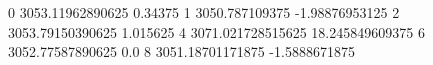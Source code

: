 0 3053.11962890625 0.34375
1 3050.787109375 -1.98876953125
2 3053.79150390625 1.015625
4 3071.021728515625 18.245849609375
6 3052.77587890625 0.0
8 3051.18701171875 -1.5888671875
